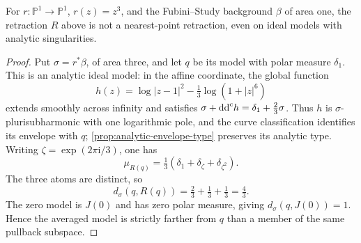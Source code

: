 \begin{example}\label{finite-curve:averaging-not-nearest}
For $r\colon\mathbb P^1\to\mathbb P^1$, $r(z)=z^3$, and the
Fubini--Study background $\beta$ of area one, the retraction
$R$ above is not a nearest-point retraction, even on ideal
models with analytic singularities.
\end{example}
\begin{proof}
Put $\sigma=r^*\beta$, of area three, and let $q$ be its model
with polar measure $\delta_1$. This is an analytic ideal model:
in the affine coordinate, the global function
\[
 h(z)=\log|z-1|^2-\tfrac13\log(1+|z|^6)
\]
extends smoothly across infinity and satisfies
$\sigma+\mathrm{dd}^{\mathrm{c}} h=\delta_1+\tfrac23\sigma$.
Thus $h$ is $\sigma$-plurisubharmonic with one logarithmic pole,
and the curve classification identifies its envelope with $q$;
\cref{prop:analytic-envelope-type} preserves its analytic type.
Writing $\zeta=\exp(2\pi\mathrm i/3)$, one has
\[
 \mu_{R(q)}=\tfrac13(\delta_1+\delta_\zeta+\delta_{\zeta^2}).
\]
The three atoms are distinct, so
\[
 d_\sigma(q,R(q))=\tfrac23+\tfrac13+\tfrac13=\tfrac43.
\]
The zero model is $J(0)$ and has zero polar measure, giving
$d_\sigma(q,J(0))=1$. Hence the averaged model is strictly
farther from $q$ than a member of the same pullback subspace.
\end{proof}
